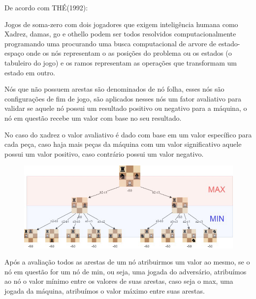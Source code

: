 De acordo com THÉ(1992):
\begin{citacao}
    Jogos de soma-zero com dois jogadores que exigem inteligência humana como Xadrez, damas, go e othello
    podem ser todos resolvidos computacionalmente programando uma procurando uma busca computacional de
    arvore de estado-espaço onde os nós representam o as posições do problema ou os estados (o tabuleiro do jogo)
    e os ramos representam as operações que transformam um estado em outro.\cite[tradução nossa.]{ERICTHE}
\end{citacao}

Nós que não possuem arestas são denominados de nó folha, esses nós são configurações de fim de jogo, são aplicados nesses nós um fator avaliativo
para validar se aquele nó possui um resultado positivo ou negativo para a máquina, o nó em questão recebe um valor com base no seu resultado.

No caso do xadrez o valor avaliativo é dado com base em um valor específico para cada peça, caso haja mais peças da máquina com um valor
significativo aquele  possui um valor positivo, caso contrário possui um valor negativo.
\begin{figure}[!htb]
    \centering
    \label{minimax-chess}
    \includegraphics[scale=0.25]{figuras/Minimax Chess.jpeg}
\end{figure}

Após a avaliação todos as arestas de um nó atribuirmos um valor ao mesmo, se o nó em questão for um nó de min, ou seja, uma jogada
do adversário, atribuímos ao nó o valor mínimo entre os valores de suas arestas, caso seja o max, uma jogada da máquina, atribuímos
o valor máximo entre suas arestas.

